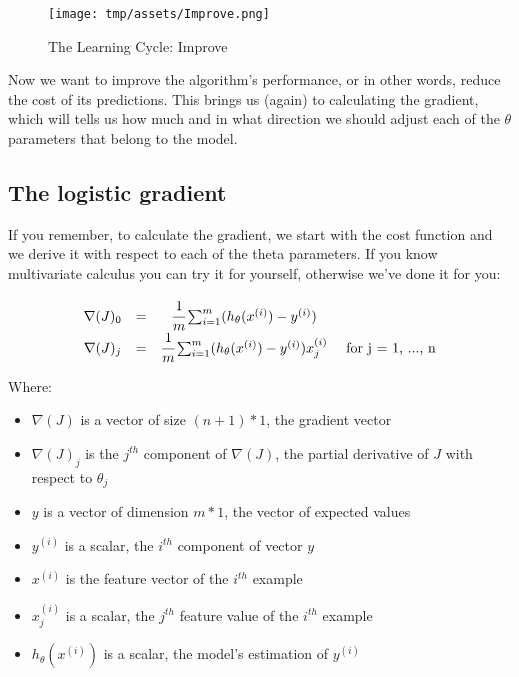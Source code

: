 \documentclass[]{article}
\begin{document}
\begin{figure}
\centering
\texttt{[image: tmp/assets/Improve.png]}
\caption{The Learning Cycle: Improve}
\end{figure}

Now we want to improve the algorithm's performance, or in other words,
reduce the cost of its predictions. This brings us (again) to
calculating the gradient, which will tells us how much and in what
direction we should adjust each of the \(\theta\) parameters that belong
to the model.

\hypertarget{the-logistic-gradient}{%
\subsection{The logistic gradient}\label{the-logistic-gradient}}

If you remember, to calculate the gradient, we start with the cost
function and we derive it with respect to each of the theta parameters.
If you know multivariate calculus you can try it for yourself, otherwise
we've done it for you:

\large

\[
\begin{matrix}
\nabla(J)_0 &  = &\cfrac{1}{m}\sum_{i=1}^{m}(h_{\theta}(x^{(i)}) - y^{(i)}) & \\
\nabla(J)_j & = &\cfrac{1}{m}\sum_{i=1}^{m}(h_{\theta}(x^{(i)}) - y^{(i)})x_{j}^{(i)} & \text{ for j = 1, ..., n}    
\end{matrix}
\] \normalsize

Where:

\begin{itemize}
\item
  \(\nabla(J)\) is a vector of size \((n + 1) * 1\), the gradient vector
\item
  \(\nabla(J)_j\) is the \(j^{th}\) component of \(\nabla(J)\), the
  partial derivative of \(J\) with respect to \(\theta_j\)
\item
  \(y\) is a vector of dimension \(m * 1\), the vector of expected
  values
\item
  \(y^{(i)}\) is a scalar, the \(i^{th}\) component of vector \(y\)
\item
  \(x^{(i)}\) is the feature vector of the \(i^{th}\) example
\item
  \(x^{(i)}_j\) is a scalar, the \(j^{th}\) feature value of the
  \(i^{th}\) example
\item
  \(h_{\theta}(x^{(i)})\) is a scalar, the model's estimation of
  \(y^{(i)}\)
\end{itemize}
\end{document}
